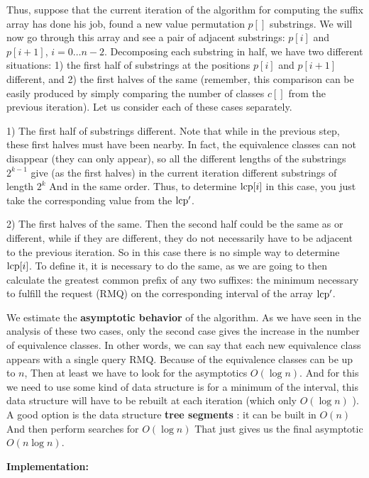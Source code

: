 Thus, suppose that the current iteration of the algorithm for computing the suffix array has done his job, found a new value permutation $p []$ substrings. We will now go through this array and see a pair of adjacent substrings: $p [i]$ and $p [i +1]$, $i = 0 \ldots n-2$. Decomposing each substring in half, we have two different situations: 1) the first half of substrings at the positions $p [i]$ and $p [i +1]$ different, and 2) the first halves of the same (remember, this comparison can be easily produced by simply comparing the number of classes $c []$ from the previous iteration). Let us consider each of these cases separately.

1) The first half of substrings different. Note that while in the previous step, these first halves must have been nearby. In fact, the equivalence classes can not disappear (they can only appear), so all the different lengths of the substrings $2 ^ {k-1}$ give (as the first halves) in the current iteration different substrings of length $2 ^ k$ And in the same order. Thus, to determine ${\rm lcp} [i]$ in this case, you just take the corresponding value from the $\rm lcp ^ \prime$.

2) The first halves of the same. Then the second half could be the same as or different, while if they are different, they do not necessarily have to be adjacent to the previous iteration. So in this case there is no simple way to determine ${\rm lcp} [i]$. To define it, it is necessary to do the same, as we are going to then calculate the greatest common prefix of any two suffixes: the minimum necessary to fulfill the request (RMQ) on the corresponding interval of the array $\rm lcp ^ \prime$.

We estimate the \textbf{asymptotic behavior} of the algorithm. As we have seen in the analysis of these two cases, only the second case gives the increase in the number of equivalence classes. In other words, we can say that each new equivalence class appears with a single query RMQ. Because of the equivalence classes can be up to $n$, Then at least we have to look for the asymptotics $O (\log n)$. And for this we need to use some kind of data structure is for a minimum of the interval, this data structure will have to be rebuilt at each iteration (which only $O (\log n)$ ). A good option is the data structure \textbf{tree segments} : it can be built in $O (n)$ And then perform searches for $O (\log n)$ That just gives us the final asymptotic $O (n \log n)$.

\textbf{Implementation:}

